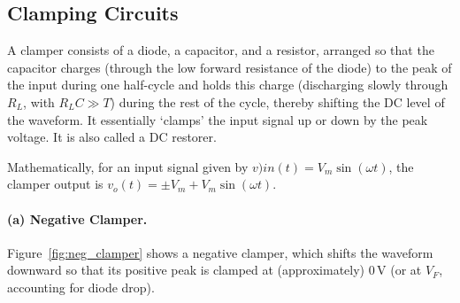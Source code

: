 \subsection{Clamping Circuits}

A clamper consists of a diode, a capacitor, and a resistor, arranged so that the capacitor charges (through the low forward resistance of the diode) to the peak of the input during one half-cycle and holds this charge (discharging slowly through $R_L$, with $R_LC \gg T$) during the rest of the cycle, thereby shifting the DC level of the waveform. It essentially `clamps' the input signal up or down by the peak voltage. It is also called a DC restorer.

Mathematically, for an input signal given by $v){in}(t) = V_m\sin(\omega t)$, the clamper output is $v_o(t)= \pm V_m + V_m\sin(\omega t)$.

\paragraph{(a) Negative Clamper.}
Figure~\ref{fig:neg_clamper} shows a negative clamper, which shifts the waveform downward so that its positive peak is clamped at (approximately) $0\,\text{V}$ (or at $V_F$, accounting for diode drop).

